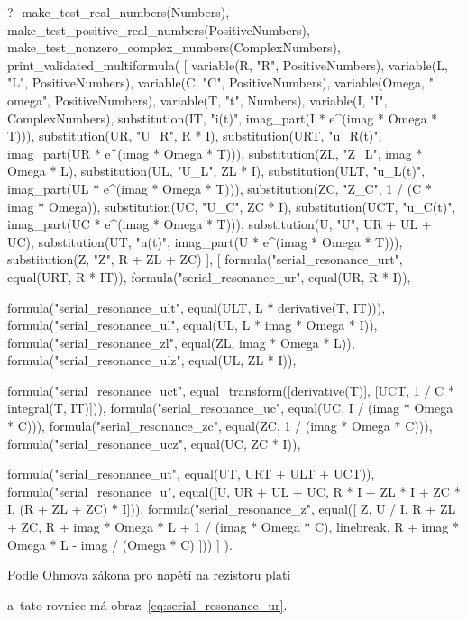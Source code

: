 \begin{prolog}
?-	make_test_real_numbers(Numbers),
	make_test_positive_real_numbers(PositiveNumbers),
	make_test_nonzero_complex_numbers(ComplexNumbers),
	print_validated_multiformula(
		[
			variable(R, "R", PositiveNumbers),
			variable(L, "L", PositiveNumbers),
			variable(C, "C", PositiveNumbers),
			variable(Omega, "\\omega", PositiveNumbers),
			variable(T, "t", Numbers),
			variable(I, "I", ComplexNumbers),
			substitution(IT, "i(t)", imag_part(I * e^(imag * Omega * T))),
			substitution(UR, "U_R", R * I),
			substitution(URT, "u_R(t)", imag_part(UR * e^(imag * Omega * T))),
			substitution(ZL, "Z_L", imag * Omega * L),
			substitution(UL, "U_L", ZL * I),
			substitution(ULT, "u_L(t)", imag_part(UL * e^(imag * Omega * T))),
			substitution(ZC, "Z_C", 1 / (C * imag * Omega)),			
			substitution(UC, "U_C", ZC * I),
			substitution(UCT, "u_C(t)", imag_part(UC * e^(imag * Omega * T))),
			substitution(U, "U", UR + UL + UC),
			substitution(UT, "u(t)", imag_part(U * e^(imag * Omega * T))),
			substitution(Z, "Z", R + ZL + ZC)
		],
		[
			formula("serial_resonance_urt", equal(URT, R * IT)),
			formula("serial_resonance_ur", equal(UR, R * I)),
			
			formula("serial_resonance_ult", equal(ULT, L * derivative(T, IT))),
			formula("serial_resonance_ul", equal(UL, L * imag * Omega * I)),
			formula("serial_resonance_zl", equal(ZL, imag * Omega * L)),
			formula("serial_resonance_ulz", equal(UL, ZL * I)),
			
			formula("serial_resonance_uct", equal_transform([derivative(T)], [UCT, 1 / C * integral(T, IT)])),
			formula("serial_resonance_uc", equal(UC, I / (imag * Omega * C))),
			formula("serial_resonance_zc", equal(ZC, 1 / (imag * Omega * C))),
			formula("serial_resonance_ucz", equal(UC, ZC * I)),
			
			formula("serial_resonance_ut", equal(UT, URT + ULT + UCT)),
			formula("serial_resonance_u", equal([U, UR + UL + UC, R * I + ZL * I + ZC * I, (R + ZL + ZC) * I])),
			formula("serial_resonance_z", equal([
				Z, U / I, R + ZL + ZC, R + imag * Omega * L + 1 / (imag * Omega * C),
				linebreak,
				R + imag * Omega * L - imag / (Omega * C)
			]))
		]
	).
\end{prolog}

Podle Ohmova zákona pro napětí na rezistoru platí


a~tato rovnice má obraz~\eqref{eq:serial_resonance_ur}.

